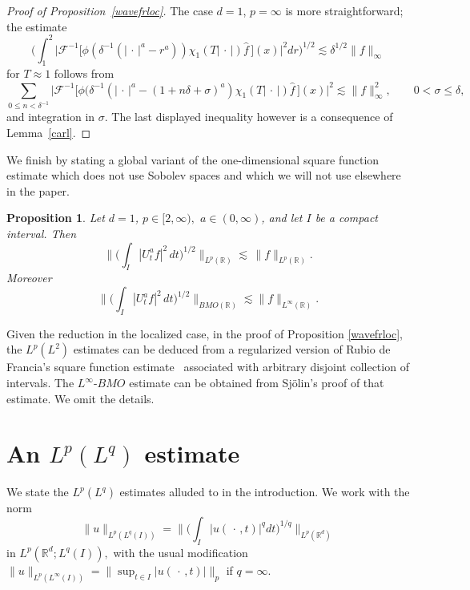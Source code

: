 \documentclass[11pt]{amsart}
\newtheorem{proposition}[theorem]{Proposition}
\theoremstyle{definition}
\numberwithin{theorem}{section}
\numberwithin{definition}{section}
\newcommand{\Be}{\begin{equation}}
\newcommand{\Ee}{\end{equation}}
\newcommand{\note}[1]{\footnote{\texttt{\Small #1}}}
\def\lc{\lesssim}
\def\bbR{{\mathbb {R}}}
\def\cF{{\mathcal {F}}}
\begin{document}
\begin{proof} [Proof of Proposition~\ref{wavefrloc}]
The case $d=1$, $p=\infty$ is more straightforward; the estimate
\Be\label{BRsqfctinfty}
 \Big(\int_{1}^2\big| \cF^{-1} \big[
\phi( \delta^{-1} (|\,\cdot\,|^a-r^a))
\chi_1(T|\,\cdot\,|)\widehat f\,\big](x)\big|^2 dr\Big)^{1/2}\lc \delta^{1/2}
 \|f\|_{\infty}
\Ee
for $T\approx 1$ follows from
$$
\sum_{0\le n< \delta^{-1}}
\big| \cF^{-1} \big[
\phi( \delta^{-1} (|\,\cdot\,|^a-(1+n\delta+\sigma)^a)
\chi_1(T|\,\cdot\,|)\widehat f\,\big](x)\big|^2 \lc
 \|f\|_{\infty}^2, \qquad 0<\sigma\le \delta,
$$
and integration in $\sigma$. The last displayed inequality however
is a consequence of   Lemma~\ref{carl}.
\end{proof}




We finish by stating a global variant of the one-dimensional square function estimate which does not use Sobolev spaces and which we will not use elsewhere in the paper.


\begin{proposition}\label{combin2} Let $d=1$, $p\in[2,\infty),$ $a\in(0,\infty)$,  and let $I$ be a compact interval.
Then
$$
\Big \|\Big(\int_I|U^a_tf|^2\,dt\Big)^{1/2}\Big\|_{L^p(\bbR)}
\lc\, \|f\|_{L^p(\bbR)}.
$$
Moreover
$$\Big \|\Big(\int_I|U^a_t f|^2\, dt\Big)^{1/2}
\Big\|_{BMO(\bbR)} \lc\|f\|_{L^\infty(\bbR)}.
$$
\end{proposition}
Given the reduction in the localized case, in the proof of Proposition
\ref{wavefrloc}, the $L^p(L^2)$ estimates can be deduced
from a regularized version of
Rubio de Francia's square function estimate~\cite{ru1}
associated with
arbitrary disjoint  collection of intervals.
The $L^\infty$-$BMO$ estimate can be obtained from Sj\"olin's proof
\cite{sj2}  of that estimate. We omit the details.

\section{An $L^p(L^q)$ estimate}\label{LpLqsect}

We state the
$L^p(L^q)$ estimates alluded to in the introduction.
We work with the norm
$$\|u\|_{L^p(L^q(I))}
= \Big\|\Big(\int_I|u(\,\cdot\,,t)|^q dt\Big)^{1/q}\Big\|_{L^p(\bbR^d)}$$
in $L^p(\bbR^d;L^q(I)),$ with  the usual  modification
$\|u\|_{L^p(L^\infty(I))}
= \|\sup_{t\in I}|u(\,\cdot\,,t)|\|_p$ if $q=\infty$.
\end{document}
